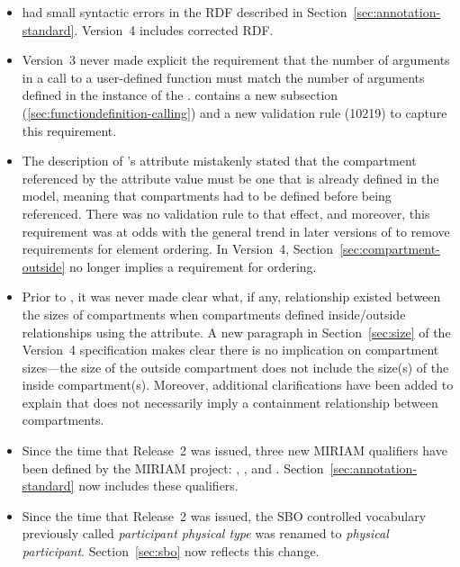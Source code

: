 \begin{blockChanged}
\begin{itemize}
\item \sbmltwothree had small syntactic errors in the RDF
  described in Section~\ref{sec:annotation-standard}.  Version~4
  includes corrected RDF.

\item Version~3 never made explicit the requirement that the
  number of arguments in a call to a user-defined function must
  match the number of arguments defined in the instance of the
  \FunctionDefinition.  \sbmltwofour contains a new subsection
  (\ref{sec:functiondefinition-calling}) and a new validation rule
  (10219) to capture this requirement.

\item The description of \Compartment's  attribute
  mistakenly stated that the compartment referenced by the
  attribute value must be one that is already defined in the
  model, meaning that compartments had to be defined before being
  referenced.  There was no validation rule to that effect, and
  moreover, this requirement was at odds with the general trend in
  later versions of \sbmltwo to remove requirements for
  element ordering.  In Version~4,
  Section~\ref{sec:compartment-outside} no longer implies a
  requirement for ordering.

\item Prior to \sbmltwofour, it was never made clear what, if any,
  relationship existed between the sizes of compartments when
  compartments defined inside/outside relationships using the
   attribute.  A new paragraph in
  Section~\ref{sec:size} of the Version~4 specification makes
  clear there is no implication on compartment sizes---the size of
  the outside compartment does not include the size(s) of the
  inside compartment(s).  Moreover, additional clarifications have
  been added to explain that  does not necessarily
  imply a containment relationship between compartments.

\item Since the time that \sbmltwothree Release~2 was issued,
  three new MIRIAM qualifiers have been defined by the MIRIAM
  project: , , and
  .  Section~\ref{sec:annotation-standard}
  now includes these qualifiers.

\item Since the time that \sbmltwothree Release~2 was issued, the
  SBO controlled vocabulary previously called \emph{participant
    physical type} was renamed to \emph{physical participant}.
  Section~\ref{sec:sbo} now reflects this change.


\end{itemize}
\end{blockChanged}
